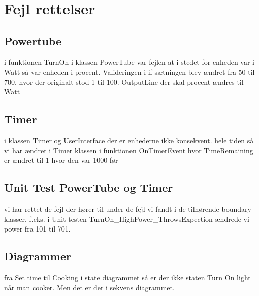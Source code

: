 \section{Fejl rettelser}

\subsection{Powertube}
i funktionen TurnOn i klassen PowerTube var fejlen at i stedet for enheden var i Watt så var enheden i procent. Valideringen i if sætningen blev ændret fra 50 til 700. hvor der originalt stod 1 til 100. OutputLine der skal procent ændres til Watt
\subsection{Timer}
i klassen Timer og UserInterface der er enhederne ikke konsekvent. hele tiden så vi har ændret i Timer klassen i funktionen OnTimerEvent hvor TimeRemaining er ændret til 1 hvor den var 1000 før 
\subsection{Unit Test PowerTube og Timer}
vi har rettet de fejl der hører til under de fejl vi fandt i de tilhørende boundary klasser. f.eks. i Unit testen TurnOn\_HighPower\_ThrowsExpection ændrede vi power fra 101 til 701.

\subsection{Diagrammer}
fra Set time til Cooking i state diagrammet så er der ikke staten Turn On light når man cooker. Men det er der i sekvens diagrammet.
